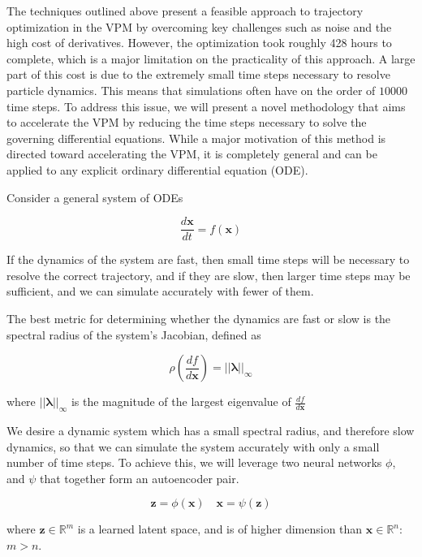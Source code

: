 \documentclass[12pt, letterpaper]{article}
\begin{document}
The techniques outlined above present a feasible approach to trajectory optimization in the VPM by overcoming key challenges such as noise and the high cost of derivatives.  However, the optimization took roughly 428 hours to complete, which is a major limitation on the practicality of this approach. A large part of this cost is due to the extremely small time steps necessary to resolve particle dynamics.  This means that simulations often have on the order of $10000$ time steps.  To address this issue, we will present a novel methodology that aims to accelerate the VPM by reducing the time steps necessary to solve the governing differential equations.  While a major motivation of this method is directed toward accelerating the VPM, it is completely general and can be applied to any explicit ordinary differential equation (ODE).  

Consider a general system of ODEs

\begin{equation}
    \frac{d\mathbf{x}}{dt} = f(\mathbf{x})
\end{equation}

If the dynamics of the system are fast, then small time steps will be necessary to resolve the correct trajectory, and if they are slow, then larger time steps may be sufficient, and we can simulate accurately with fewer of them.

The best metric for determining whether the dynamics are fast or slow is the spectral radius of the system's Jacobian, defined as

\begin{equation}
    \rho\left(\frac{df}{d \mathbf{x}}\right) = ||\boldsymbol{\lambda}||_{\infty}
\end{equation}

where $||\boldsymbol{\lambda}||_{\infty}$ is the magnitude of the largest eigenvalue of $\frac{df}{d\mathbf{x}}$

We desire a dynamic system which has a small spectral radius, and therefore slow dynamics, so that we can simulate the system accurately with only a small number of time steps.  To achieve this, we will leverage two neural networks $\phi$, and $\psi$ that together form an autoencoder pair.

\begin{equation}
    \mathbf{z} = \phi(\mathbf{x}) \quad \mathbf{x} = \psi(\mathbf{z})
\end{equation}

where $\mathbf{z} \in \mathbb{R}^m$ is a learned latent space, and is of higher dimension than $\mathbf{x} \in \mathbb{R}^n$:  $m > n$. 
\end{document}

